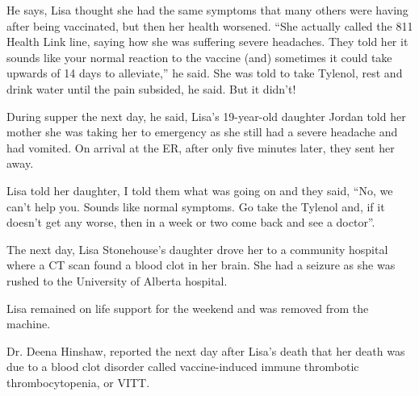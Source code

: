 He says, Lisa thought she had the same symptoms that many others were having
after being vaccinated, but then her health worsened. “She actually called the
811 Health Link line, saying how she was suffering severe headaches. They told
her it sounds like your normal reaction to the vaccine (and) sometimes it could
take upwards of 14 days to alleviate,” he said. She was told to take Tylenol,
rest and drink water until the pain subsided, he said. But it didn’t!

During supper the next day, he said, Lisa’s 19-year-old daughter Jordan told her
mother she was taking her to emergency as she still had a severe headache and
had vomited. On arrival at the ER, after only five minutes later, they sent her
away.

Lisa told her daughter, I told them what was going on and they said, “No, we
can’t help you. Sounds like normal symptoms. Go take the Tylenol and, if it
doesn’t get any worse, then in a week or two come back and see a doctor”.

The next day, Lisa Stonehouse’s daughter drove her to a community hospital where
a CT scan found a blood clot in her brain. She had a seizure as she was rushed
to the University of Alberta hospital.

Lisa remained on life support for the weekend and was removed from the machine.

Dr. Deena Hinshaw, reported the next day after Lisa’s death that her death was
due to a blood clot disorder called vaccine-induced immune thrombotic
thrombocytopenia, or VITT.

